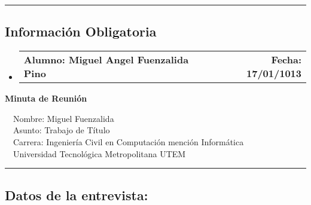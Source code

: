\documentclass[10pt,letterpaper]{article}
\makeatletter
\newcommand{\headerrow}[2]
{\begin{tabular*}{\linewidth}{l@{\extracolsep{\fill}}r}
	#1 &
	#2 \\
\end{tabular*}}
\makeatother
\begin{document}
\hrule
\vspace{-0.4em}
\subsection*{Información Obligatoria}

\begin{itemize}
	\parskip=0.1em

	\item 
	\headerrow
		{\textbf{Alumno: Miguel Angel Fuenzalida Pino}}
		{\textbf{Fecha: 17/01/1013}}

\end{itemize}
\newpage
\begin{center}
{\LARGE \textbf{Minuta de Reunión}}

\ \ \textbullet Nombre: Miguel Fuenzalida
\\
\ \ \textbullet Asunto: Trabajo de Título
\\
\ \ \textbullet Carrera: Ingeniería Civil en Computación mención Informática
\\
\ \ \textbullet Universidad Tecnológica Metropolitana UTEM
\end{center}

\hrule
\vspace{-0.4em}
\subsection*{Datos de la entrevista:}
\end{document}
